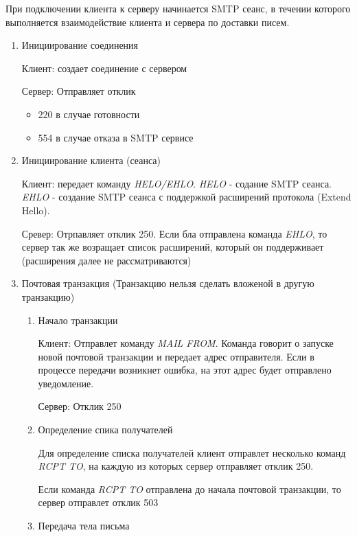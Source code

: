 \documentclass[a4paper,12pt]{report}
\begin{document}
	 При подключении клиента к серверу начинается SMTP сеанс, в течении которого выполняется взаимодействие клиента и сервера по доставки писем.
	 \begin{enumerate}
	     \item Инициирование соединения 
	     
	     Клиент: создает соединение с сервером
	     
	     Сервер: Отправляет отклик
	     \begin{itemize}
	         \item 220 в случае готовности
	         \item 554 в случае отказа в SMTP сервисе
	     \end{itemize}
	     \item Инициирование клиента (сеанса)
	     
	     Клиент: передает команду \textit{HELO/EHLO}. \textit{HELO} - содание SMTP сеанса. \textit{EHLO} - создание SMTP сеанса с поддержкой расширений протокола (Extend Hello).
	     
	     Сревер: Отрпавляет отклик 250. Если бла отправлена команда \textit{EHLO}, то сервер так же возращает список расширений, который он поддерживает (расширения далее не рассматриваются)
	     
	     \item Почтовая транзакция (Транзакцию нельзя сделать вложеной в другую транзакцию)
	     \begin{enumerate}
	         \item \label{item:mail_transaction} Начало транзакции
	         
	         Клиент: Отправлет команду \textit{MAIL FROM}. Команда говорит о запуске новой почтовой транзакции и передает адрес отправителя. Если в процессе передачи возникнет ошибка, на этот адрес будет отправлено уведомление.
	         
	         Сервер: Отклик 250
	         
	         \item Определение спика получателей
	         
	         Для определение списка получателей клиент отправлет несколько команд \textit{RCPT TO}, на каждую из которых сервер отправляет отклик 250.
	         
	         Если команда \textit{RCPT TO} отправлена до начала почтовой транзакции, то сервер отправлет отклик 503
	         
	         \item Передача тела письма 
	         

\end{enumerate}
\end{enumerate}
\end{document}
